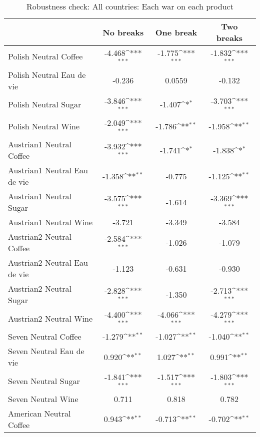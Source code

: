 \begin{table}[htbp]\centering
\def\sym#1{\ifmmode^{#1}\else\(^{#1}\)\fi}
\caption{Robustness check: All countries: Each war on each product\label{tab1}}
\begin{tabular}{l*{3}{c}}
\hline\hline
                    &\multicolumn{1}{c}{No breaks}&\multicolumn{1}{c}{One break}&\multicolumn{1}{c}{Two breaks}\\
\hline
Polish Neutral Coffee&      -4.468\sym{***}&      -1.775\sym{***}&      -1.832\sym{***}\\
Polish Neutral Eau de vie&      -0.236         &      0.0559         &      -0.132         \\
Polish Neutral Sugar&      -3.846\sym{***}&      -1.407\sym{*}  &      -3.703\sym{***}\\
Polish Neutral Wine &      -2.049\sym{***}&      -1.786\sym{**} &      -1.958\sym{**} \\
Austrian1 Neutral Coffee&      -3.932\sym{***}&      -1.741\sym{*}  &      -1.838\sym{*}  \\
Austrian1 Neutral Eau de vie&      -1.358\sym{**} &      -0.775         &      -1.125\sym{**} \\
Austrian1 Neutral Sugar&      -3.575\sym{***}&      -1.614         &      -3.369\sym{***}\\
Austrian1 Neutral Wine&      -3.721         &      -3.349         &      -3.584         \\
Austrian2 Neutral Coffee&      -2.584\sym{***}&      -1.026         &      -1.079         \\
Austrian2 Neutral Eau de vie&      -1.123         &      -0.631         &      -0.930         \\
Austrian2 Neutral Sugar&      -2.828\sym{***}&      -1.350         &      -2.713\sym{***}\\
Austrian2 Neutral Wine&      -4.400\sym{***}&      -4.066\sym{***}&      -4.279\sym{***}\\
Seven Neutral Coffee&      -1.279\sym{**} &      -1.027\sym{**} &      -1.040\sym{**} \\
Seven Neutral Eau de vie&       0.920\sym{**} &       1.027\sym{**} &       0.991\sym{**} \\
Seven Neutral Sugar &      -1.841\sym{***}&      -1.517\sym{***}&      -1.803\sym{***}\\
Seven Neutral Wine  &       0.711         &       0.818         &       0.782         \\
American Neutral Coffee&       0.943\sym{**} &      -0.713\sym{**} &      -0.702\sym{**} \\

\end{tabular}
\end{table}
